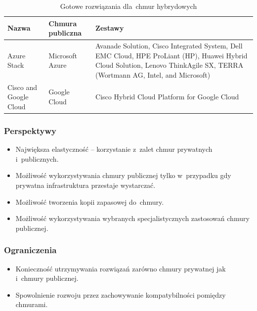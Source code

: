\documentclass[12pt,a4paper,twoside,titlepage,openright]{book}
\begin{document}
\noindent
\begin{small}
\begin{table}[h!]
%
\begin{tabularx}{\textwidth}{ |L|L|L| }

\hline
Nazwa & Chmura publiczna & Zestawy \\
\hline
Azure Stack \cite{siteAzureStack} & Microsoft Azure & 
Avanade Solution, \newline
Cisco Integrated System, \newline
Dell EMC Cloud, \newline
HPE ProLiant (HP), \newline
Huawei Hybrid Cloud Solution, \newline
Lenovo ThinkAgile SX, \newline
TERRA (Wortmann AG, Intel, and Microsoft) \\
\hline
Cisco and Google Cloud \cite{siteGoogleCisco} & Google Cloud & Cisco Hybrid Cloud Platform for Google Cloud \\
\hline


\end{tabularx}


\caption{Gotowe rozwiązania dla~chmur hybrydowych}
		\label{table:hybridIntegrated}

\end{table}
\end{small}


\subsubsection{Perspektywy}
\begin{itemize}
\item Największa elastyczność -- korzystanie z~zalet chmur prywatnych i~publicznych.
\item Możliwość wykorzystywania chmury publicznej tylko w~przypadku gdy prywatna infrastruktura przestaje wystarczać.
\item Możliwość tworzenia kopii zapasowej do~chmury.
\item Możliwość wykorzystywania wybranych specjalistycznych zastosowań chmury publicznej.
\end{itemize}

\subsubsection{Ograniczenia}
\begin{itemize}
\item Konieczność utrzymywania rozwiązań zarówno chmury prywatnej jak i~chmury publicznej.
\item Spowolnienie rozwoju przez zachowywanie kompatybilności pomiędzy chmurami.
\end{itemize}
\end{document}
